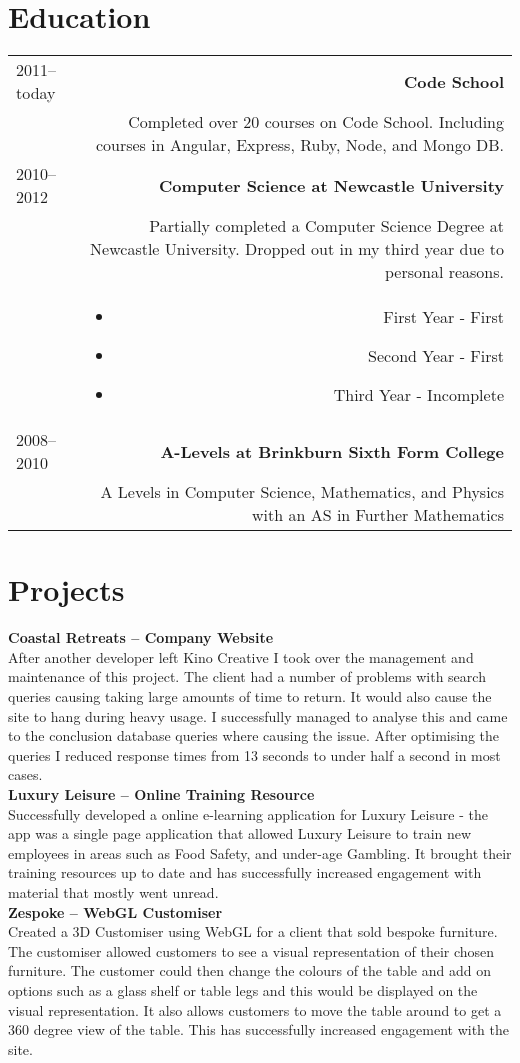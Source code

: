 \documentclass[10pt]{article}
\begin{document}
\section*{Education}
\begin{tabular}{L!{\VRule}R}
2011--today&{\bf Code School}\\
&Completed over 20 courses on Code School. Including courses in Angular, Express, Ruby, Node, and Mongo DB.\\
2010--2012&{\bf Computer Science at Newcastle University}\\
&Partially completed a Computer Science Degree at Newcastle University. Dropped out in my third year due to personal reasons.\\
&\begin{itemize}
\item First Year - First
\item Second Year - First
\item Third Year - Incomplete
\end{itemize}\\
2008--2010&{\bf A-Levels at Brinkburn Sixth Form College}\\
&A Levels in Computer Science, Mathematics, and Physics with an AS in Further Mathematics
\end{tabular}

\section*{Projects}
{\bf Coastal Retreats -- Company Website}\\
After another developer left Kino Creative I took over the management and maintenance of this project. The client had a number of problems with search queries causing taking large amounts of time to return. It would also cause the site to hang during heavy usage. I successfully managed to analyse this and came to the conclusion database queries where causing the issue. After optimising the queries I reduced response times from 13 seconds to under half a second in most cases.\\
{\bf Luxury Leisure -- Online Training Resource}\\
Successfully developed a online e-learning application for Luxury Leisure - the app was a single page application that allowed Luxury Leisure to train new employees in areas such as Food Safety, and under-age Gambling. It brought their training resources up to date and has successfully increased engagement with material that mostly went unread.\\
{\bf Zespoke -- WebGL Customiser}\\
Created a 3D Customiser using WebGL for a client that sold bespoke furniture. The customiser allowed customers to see a visual representation of their chosen furniture. The customer could then change the colours of the table and add on options such as a glass shelf or table legs and this would be displayed on the visual representation. It also allows customers to move the table around to get a 360 degree view of the table. This has successfully increased engagement with the site.\\
\end{document}
